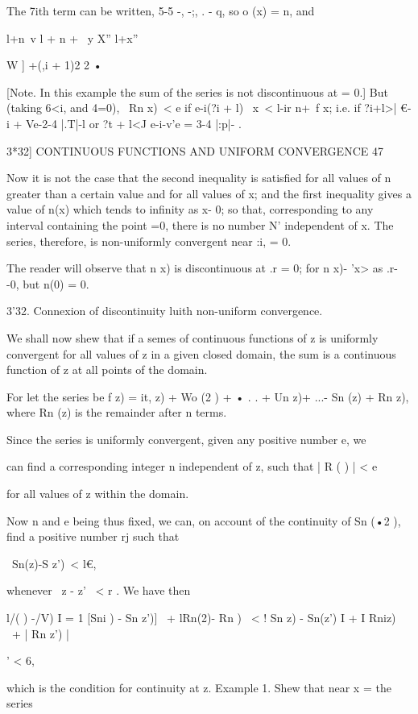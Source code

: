 The 7ith term can be written, 5-5 -, -;, . - q, so o (x) = n,
and

l+n\ v l + n + \ y X'' l+x''

  W ] +(,i + 1)2 2 •

[Note. In this example the sum of the series is not discontinuous at =
0.] But (taking 6<i, and 4=0), \ Rn x)\ < e if e-i(?i + l) \ x\ < l-ir
n+\ f x; i.e. if ?i+l>| €-i + Ve-2-4 |.T|-l or ?t + l<J e-i-v'e = 3-4
|:p|- .



3*32] CONTINUOUS FUNCTIONS AND UNIFORM CONVERGENCE 47

Now it is not the case that the second inequality is satisfied for all
values of n greater than a certain value and for all values of x; and
the first inequality gives a value of n(x) which tends to infinity as
x- 0; so that, corresponding to any interval containing the point =0,
there is no number N' independent of x. The series, therefore, is
non-uniformly convergent near :i, = 0.

The reader will observe that n x) is discontinuous at .r = 0; for n
x)- 'x> as .r- -0, but n(0) = 0.

3'32. Connexion of discontinuity luith non-uniform convergence.

We shall now shew that if a semes of continuous functions of z is
uniformly convergent for all values of z in a given closed domain, the
sum is a continuous function of z at all points of the domain.

For let the series be f z) = it, z) + Wo (2 ) + • . . + Un z)+ ...- Sn
(z) + Rn z), where Rn (z) is the remainder after n terms.

Since the series is uniformly convergent, given any positive number e,
we

can find a corresponding integer n independent of z, such that | R ( )
| < e

for all values of z within the domain.

Now n and e being thus fixed, we can, on account of the continuity of
Sn (•2 ), find a positive number rj such that

\ Sn(z)-S z')\ < l€,

whenever \ z - z' \ < r . We have then

l/( ) -/V) I = 1 [Sni ) - Sn z')] \ + lRn(2)- Rn ) \ < ! Sn z) -
Sn(z') I + I Rniz) \ + | Rn z') |

' < 6,

which is the condition for continuity at z. Example 1. Shew that near
x = the series

